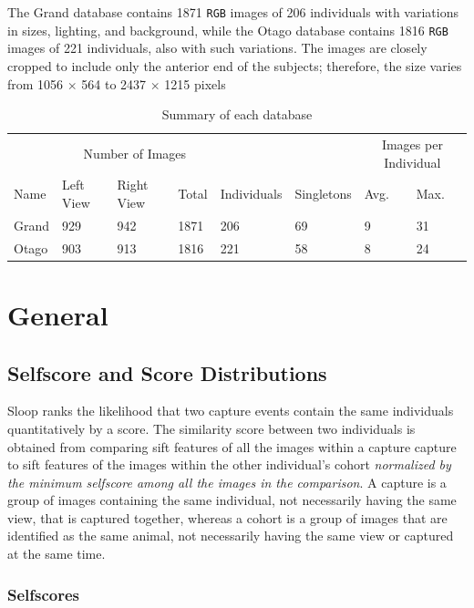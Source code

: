 The Grand database contains 1871 \texttt{RGB} images of 206 individuals with
variations in sizes, lighting, and background, while the Otago database
contains 1816 \texttt{RGB} images of 221 individuals, also with such
variations. The images are closely cropped to include only the anterior end of
the subjects; therefore, the size varies from 1056 $\times$ 564 to 2437
$\times$ 1215 pixels

\begin{table}[t]
\captionsetup{justification=centering}
  \caption{Summary of each database}
  \label{database-table}
  \centering
  \begin{tabular}{llllllll}
    \toprule
    & \multicolumn{3}{c}{Number of Images} & & &
        \multicolumn{2}{c}{Images per Individual} \\
    \cmidrule{2-4}
    \cmidrule{7-8}
    Name & Left View & Right View & Total & Individuals & Singletons & Avg.
        & Max. \\
    \midrule
    Grand & 929 & 942 & 1871 & 206  & 69 & 9 & 31 \\
    Otago & 903 & 913 & 1816 & 221  & 58 & 8 & 24 \\
    \bottomrule
  \end{tabular}
\end{table}


\section{General}

\subsection{Selfscore and Score Distributions}

Sloop ranks the likelihood that two capture events contain the same individuals
quantitatively by a score. The similarity score between two individuals is
obtained from comparing sift features of all the images within a capture
capture to sift features of the images within the other individual's cohort
\emph{normalized by the minimum selfscore among all the images in the
comparison}. A capture is a group of images containing the same individual, not
necessarily having the same view, that is captured together, whereas a cohort
is a group of images that are identified as the same animal, not necessarily
having the same view or captured at the same time.

\subsubsection{Selfscores}

